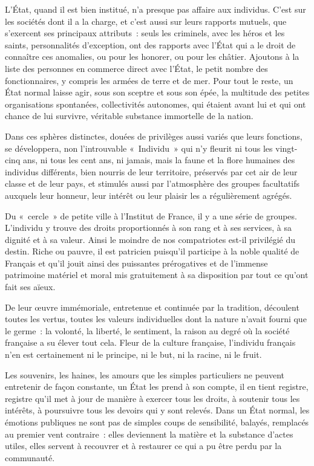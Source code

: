 \documentclass[french,twoside]{book} %
\newcommand{\astermono}{\medskip\centerline{\color{rubric}\large\selectfont{\syms ✻}}\medskip\par}%
\begin{document}
\noindent L’État, quand il est bien institué, n’a presque pas affaire aux individus. C’est sur les sociétés dont il a la charge, et c’est aussi sur leurs rapports mutuels, que s’exercent ses principaux attributs : seuls les criminels, avec les héros et les saints, personnalités d’exception, ont des rapports avec l’État qui a le droit de connaître ces anomalies, ou pour les honorer, ou pour les châtier. Ajoutons à la liste des personnes en commerce direct avec l’État, le petit nombre des fonctionnaires, y compris les armées de terre et de mer. Pour tout le reste, un État normal laisse agir, sous son sceptre et sous son épée, la multitude des petites organisations spontanées, collectivités autonomes, qui étaient avant lui et qui ont chance de lui survivre, véritable substance immortelle de la nation.\par
Dans ces sphères distinctes, douées de privilèges aussi variés que leurs fonctions, se développera, non l’introuvable « Individu » qui n’y fleurit ni tous les vingt-cinq ans, ni tous les cent ans, ni jamais, mais la faune et la flore humaines des individus différents, bien nourris de leur territoire, préservés par cet air de leur classe et de leur pays, et stimulés aussi par l’atmosphère des groupes facultatifs auxquels leur honneur, leur intérêt ou leur plaisir les a régulièrement agrégés.\par
Du « cercle » de petite ville à l’Institut de France, il y a une série de groupes. L’individu y trouve des droits proportionnés à son rang et à ses services, à sa dignité et à sa valeur. Ainsi le moindre de nos compatriotes est-il privilégié du destin. Riche ou pauvre, il est patricien puisqu’il participe à la noble qualité de Français et qu’il jouit ainsi des puissantes prérogatives et de l’immense patrimoine matériel et moral mis gratuitement à sa disposition par tout ce qu’ont fait ses aïeux.\par
De leur œuvre immémoriale, entretenue et continuée par la tradition, découlent toutes les vertus, toutes les valeurs individuelles dont la nature n’avait fourni que le germe : la volonté, la liberté, le sentiment, la raison au degré où la société française a su élever tout cela. Fleur de la culture française, l’individu français n’en est certainement ni le principe, ni le but, ni la racine, ni le fruit.\par

\astermono

\noindent Les souvenirs, les haines, les amours que les simples particuliers ne peuvent entretenir de façon constante, un État les prend à son compte, il en tient registre, registre qu’il met à jour de manière à exercer tous les droits, à soutenir tous les intérêts, à poursuivre tous les devoirs qui y sont relevés. Dans un État normal, les émotions publiques ne sont pas de simples coups de sensibilité, balayés, remplacés au premier vent contraire : elles deviennent la matière et la substance d’actes utiles, elles servent à recouvrer et à restaurer ce qui a pu être perdu par la communauté.\par
\end{document}

